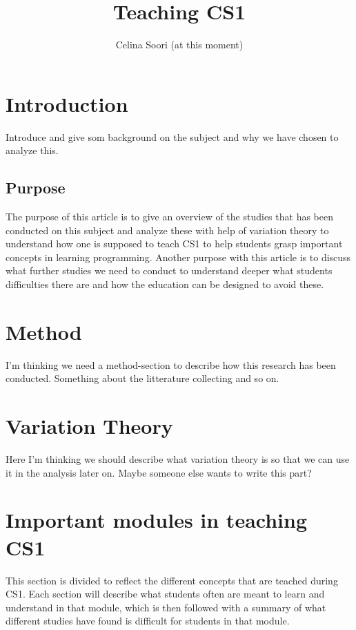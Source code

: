 \documentclass[twocolumn]{article}
\title{Teaching CS1}
\author{Celina Soori (at this moment)}
\begin{document}
\maketitle

\section{Introduction}

Introduce and give som background on the subject and why we have chosen to analyze this. 

\subsection{Purpose}

The purpose of this article is to give an overview of the studies that has been conducted on this subject and analyze these with help of variation theory to understand how one is supposed to teach CS1 to help students grasp important concepts in learning programming. Another purpose with this article is to discuss what further studies we need to conduct to understand deeper what students difficulties there are and how the education can be designed to avoid these. 

\section{Method}

I'm thinking we need a method-section to describe how this research has been conducted. Something about the litterature collecting and so on. 

\section{Variation Theory}

Here I'm thinking we should describe what variation theory is so that we can use it in the analysis later on. Maybe someone else wants to write this part?

\section{Important modules in teaching CS1}

This section is divided to reflect the different concepts that are teached during CS1. Each section will describe what students often are meant to learn and understand in that module, which is then followed with a summary of what different studies have found is difficult for students in that module. 
\end{document}
